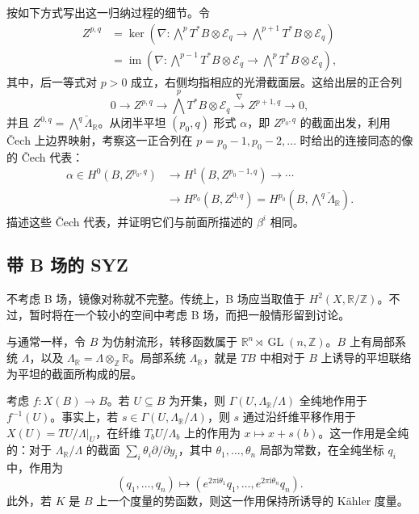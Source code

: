 \begin{exercise}\label{exer:6.21}
按如下方式写出这一归纳过程的细节。令
\[
\begin{aligned}
Z^{p,q}
&=\ker\!\left(\nabla\colon\bigwedge^pT^*B\otimes\mathcal E_q
\longrightarrow\bigwedge^{p+1}T^*B\otimes\mathcal E_q\right)\\
&=\operatorname{im}\!\left(\nabla\colon\bigwedge^{p-1}T^*B\otimes\mathcal E_q
\longrightarrow\bigwedge^pT^*B\otimes\mathcal E_q\right),
\end{aligned}
\]
其中，后一等式对 $p>0$ 成立，右侧均指相应的光滑截面层。这给出层的正合列
\[
0\longrightarrow Z^{p,q}\longrightarrow\bigwedge^pT^*B\otimes\mathcal E_q
\xrightarrow{\nabla}Z^{p+1,q}\longrightarrow0,
\]
并且 $Z^{0,q}=\bigwedge^q\check\Lambda_{\mathbb R}$。从闭半平坦 $(p_0,q)$ 形式 $\alpha$，即 $Z^{p_0,q}$ 的截面出发，利用 Čech 上边界映射，考察这一正合列在 $p=p_0-1,p_0-2,\ldots$ 时给出的连接同态的像的 Čech 代表：
\[
\begin{aligned}
\alpha\in H^0(B,Z^{p_0,q})
&\longrightarrow H^1(B,Z^{p_0-1,q})\longrightarrow\cdots\\
&\longrightarrow H^{p_0}(B,Z^{0,q})
=H^{p_0}\!\left(B,\bigwedge^q\check\Lambda_{\mathbb R}\right).
\end{aligned}
\]
描述这些 Čech 代表，并证明它们与前面所描述的 $\beta^i$ 相同。
\end{exercise}

\subsection{带 B 场的 SYZ}\label{sec:6.2.3}

不考虑 B 场，镜像对称就不完整。传统上，B 场应当取值于 $H^2(X,\mathbb R/\mathbb Z)$。不过，暂时将在一个较小的空间中考虑 B 场，而把一般情形留到讨论。

与通常一样，令 $B$ 为仿射流形，转移函数属于 $\mathbb R^n\rtimes\operatorname{GL}(n,\mathbb Z)$。$B$ 上有局部系统 $\Lambda$，以及 $\Lambda_{\mathbb R}=\Lambda\otimes_{\mathbb Z}\mathbb R$。局部系统 $\Lambda_{\mathbb R}$，就是 $TB$ 中相对于 $B$ 上诱导的平坦联络为平坦的截面所构成的层。

考虑 $f\colon X(B)\to B$。若 $U\subseteq B$ 为开集，则 $\Gamma(U,\Lambda_{\mathbb R}/\Lambda)$ 全纯地作用于 $f^{-1}(U)$。事实上，若 $s\in\Gamma(U,\Lambda_{\mathbb R}/\Lambda)$，则 $s$ 通过沿纤维平移作用于 $X(U)=TU/\Lambda|_U$，在纤维 $T_bU/\Lambda_b$ 上的作用为 $x\mapsto x+s(b)$。这一作用是全纯的：对于 $\Lambda_{\mathbb R}/\Lambda$ 的截面 $\sum_i\theta_i\partial/\partial y_i$，其中 $\theta_1,\ldots,\theta_n$ 局部为常数，在全纯坐标 $q_i$ 中，作用为
\[
(q_1,\ldots,q_n)\longmapsto
(e^{2\pi\mathrm i\theta_1}q_1,\ldots,e^{2\pi\mathrm i\theta_n}q_n).
\]
此外，若 $K$ 是 $B$ 上一个度量的势函数，则这一作用保持所诱导的 Kähler 度量。

